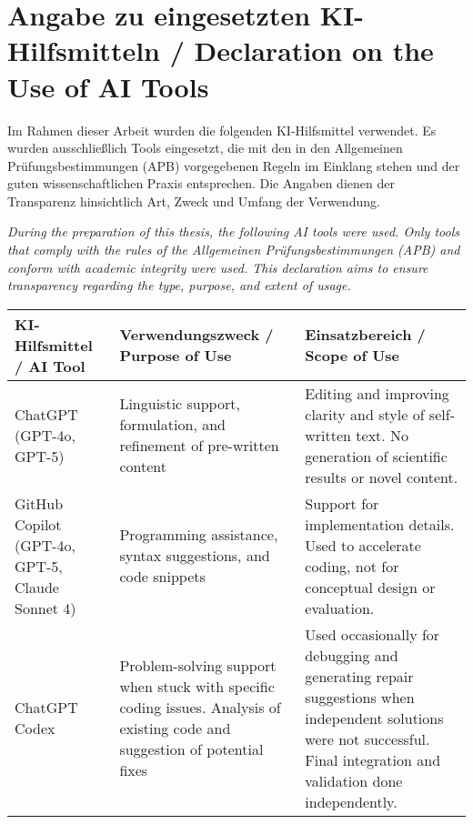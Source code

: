 \section*{Angabe zu eingesetzten KI-Hilfsmitteln / Declaration on the Use of AI Tools}
Im Rahmen dieser Arbeit wurden die folgenden KI-Hilfsmittel verwendet. 
Es wurden ausschließlich Tools eingesetzt, die mit den in den Allgemeinen Prüfungsbestimmungen (APB) vorgegebenen Regeln im Einklang stehen und der guten wissenschaftlichen Praxis entsprechen. Die Angaben dienen der Transparenz hinsichtlich Art, Zweck und Umfang der Verwendung.

\medskip

\noindent
\textit{During the preparation of this thesis, the following AI tools were used. Only tools that comply with the rules of the Allgemeinen Prüfungsbestimmungen (APB) and conform with academic integrity were used. This declaration aims to ensure transparency regarding the type, purpose, and extent of usage.}

\medskip
\vspace{0.5cm}
\begin{tabularx}{\textwidth}{|>{\raggedright\arraybackslash}X|
		>{\raggedright\arraybackslash}X|
		>{\raggedright\arraybackslash}X|}
	\hline
	\textbf{KI-Hilfsmittel / AI Tool} & \textbf{Verwendungszweck / Purpose of Use} & \textbf{Einsatzbereich / Scope of Use} \\
	\hline
	ChatGPT (GPT-4o, GPT-5) & Linguistic support, formulation, and refinement of pre-written content & Editing and improving clarity and style of self-written text. No generation of scientific results or novel content. \\
	\hline
	GitHub Copilot (GPT-4o, GPT-5, Claude Sonnet 4) & Programming assistance, syntax suggestions, and code snippets & Support for implementation details. Used to accelerate coding, not for conceptual design or evaluation. \\
	\hline
	ChatGPT Codex & Problem-solving support when stuck with specific coding issues. Analysis of existing code and suggestion of potential fixes & Used occasionally for debugging and generating repair suggestions when independent solutions were not successful. Final integration and validation done independently. \\
	\hline
\end{tabularx}
\vspace{1cm}

\noindent
